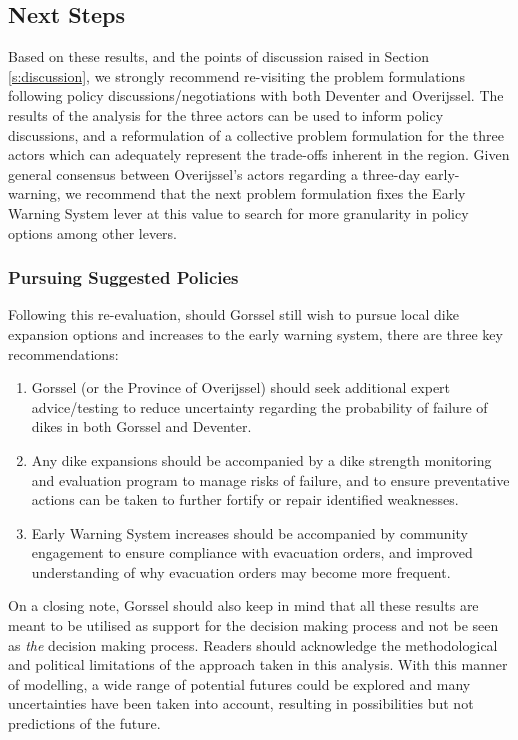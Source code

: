 \subsection{Next Steps}
Based on these results, and the points of discussion raised in Section \ref{s:discussion}, we strongly recommend re-visiting the problem formulations following policy discussions/negotiations with both Deventer and Overijssel. The results of the analysis for the three actors can be used to inform policy discussions, and a reformulation of a collective problem formulation for the three actors which can adequately represent the trade-offs inherent in the region. Given general consensus between Overijssel's actors regarding a three-day early-warning, we recommend that the next problem formulation fixes the Early Warning System lever at this value to search for more granularity in policy options among other levers.

\subsubsection{Pursuing Suggested Policies}
Following this re-evaluation, should Gorssel still wish to pursue local dike expansion options and increases to the early warning system, there are three key recommendations:
\begin{enumerate}
    \item Gorssel (or the Province of Overijssel) should seek additional expert advice/testing to reduce uncertainty regarding the probability of failure of dikes in both Gorssel and Deventer.
    \item Any dike expansions should be accompanied by a dike strength monitoring and evaluation program to manage risks of failure, and to ensure preventative actions can be taken to further fortify or repair identified weaknesses.
    \item Early Warning System increases should be accompanied by community engagement to ensure compliance with evacuation orders, and improved understanding of why evacuation orders may become more frequent.
\end{enumerate}

\noindent On a closing note, Gorssel should also keep in mind that all these results are meant to be utilised as support for the decision making process and not be seen as \textit{the} decision making process. Readers should acknowledge the methodological and political limitations of the approach taken in this analysis. With this manner of modelling, a wide range of potential futures could be explored and many uncertainties have been taken into account, resulting in possibilities but not predictions of the future.